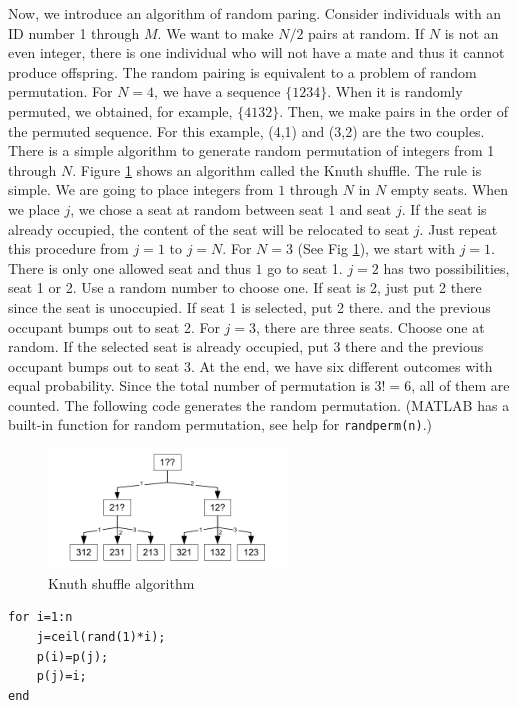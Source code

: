 Now, we introduce an algorithm of random paring.  Consider individuals with an ID number 1 through $M$.  We want to make $N/2$ pairs at random.  If $N$ is not an even integer, there is one individual who will not have a mate and thus it cannot produce offspring.  The random pairing is equivalent to a problem of random permutation. For $N=4$, we have a sequence $\{1 2 3 4\}$.  When it is randomly permuted, we obtained, for example,  $\{4 1 3 2\}$.  Then, we make pairs in the order of the permuted sequence.  For this example, (4,1) and (3,2) are the two couples.   There is a simple algorithm to generate random permutation of 
integers from 1 through $N$.  Figure \ref{fig:knuth_shuffle} shows an algorithm called the Knuth shuffle.  The rule is simple.  We are going to place integers from $1$ through $N$ in $N$ empty seats.   When we place $j$, we chose a seat at random between seat $1$ and  seat $j$.
If the seat is already occupied, the content of the seat will be relocated to seat $j$.  Just repeat this procedure from $j=1$ to $j=N$.
For $N=3$ (See Fig \ref{fig:knuth_shuffle}), we start with $j=1$.  There is only one allowed seat and thus $1$ go to seat 1. $j=2$ has two possibilities, seat 1 or 2.  Use a random number to choose one.  If seat is 2, just put 2 there since the seat is unoccupied.  If seat 1 is selected, put 2 there. and the previous occupant bumps out to seat 2.  For $j=3$, there are three seats.  Choose one at random.  If the selected seat is already occupied, put 3 there and the previous occupant bumps out to seat 3.  At the end, we have six different outcomes with equal probability.  Since the total number of permutation is $3!=6$, all of them are counted. The following code generates the random permutation. (MATLAB has a built-in function for random permutation, see help for \texttt{randperm(n)}.)

\begin{figure}
\centering
\includegraphics[width=2.5in]{19.Optimization/knuth_shuffle.pdf}
\caption{Knuth shuffle algorithm}
\label{fig:knuth_shuffle}
\end{figure}

\begin{center}
\begin{mybox}
\begin{verbatim}
for i=1:n
    j=ceil(rand(1)*i);
    p(i)=p(j);
    p(j)=i;
end
\end{verbatim}
\end{mybox}
\end{center}


